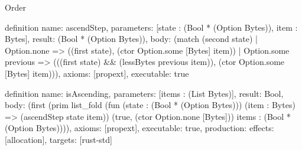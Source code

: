 \begin{lexlean}{Order}
\begin{semanticmodule}
definition{
  name: ascendStep,
  parameters: [state : (Bool * (Option Bytes)), item : Bytes],
  result: (Bool * (Option Bytes)),
  body: (match (second state)
    | Option.none => ((first state), (ctor Option.some [Bytes] item))
    | Option.some previous => (((first state) && (lessBytes previous item)), (ctor Option.some [Bytes] item))),
  axioms: [propext],
  executable: true
}

definition{
  name: isAscending,
  parameters: [items : (List Bytes)],
  result: Bool,
  body: (first (prim list_fold (fun (state : (Bool * (Option Bytes))) (item : Bytes) => (ascendStep state item)) (true, (ctor Option.none [Bytes])) items : (Bool * (Option Bytes)))),
  axioms: [propext],
  executable: true,
  production: {effects: [allocation], targets: [rust-std]}
}
\end{semanticmodule}
\end{lexlean}

